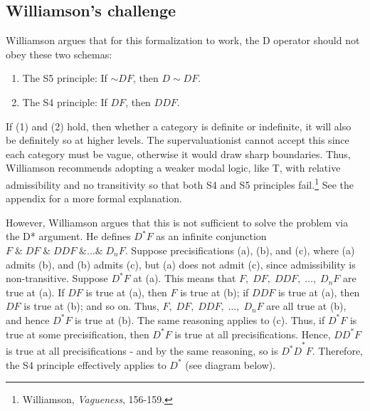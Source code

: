 \subsection{Williamson's challenge}

Williamson argues that for this formalization to work, the D operator
should not obey these two schemas:
\begin{enumerate}
\def\labelenumi{(\arabic{enumi})}
\item{The S5 principle: If ${\sim}DF$, then $D{\sim}DF$.}
\item{The S4 principle: If $DF$, then $DDF$.}
\end{enumerate}

If (1) and (2) hold, then whether a category is definite or indefinite,
it will also be definitely so at higher levels. The supervaluationist
cannot accept this since each category must be vague, otherwise it would
draw sharp boundaries. Thus, Williamson recommends adopting a weaker
modal logic, like T, with relative admissibility and no transitivity so
that both S4 and S5 principles fail.\footnote{Williamson,
  \emph{Vagueness}, 156-159.} See the appendix for a more formal
explanation.

However, Williamson argues that this is not sufficient to solve the
problem via the D* argument. He defines \(D^{*}F\) as an infinite
conjunction $F \; \&  \; DF \; \& \; DDF \; \& \ldots \& \; D_{n}F$. Suppose
precisifications (a), (b), and (c), where (a) admits (b), and (b) admits
(c), but (a) does not admit (c), since admissibility is non-transitive.
Suppose \(D^{*}F\) at (a). This means that
$F, \; DF, \; DDF, \; \ldots, \; D_{n}F$ are true at (a). If $DF$ is true at
(a), then $F$ is true at (b); if $DDF$ is true at (a), then $DF$
is true at (b); and so on. Thus, $F, \; DF, \; DDF, \; \ldots, \; D_{n}F$ are
all true at (b), and hence $D^{*}F$ is true at (b). The same reasoning
applies to (c). Thus, if $D^{*}F$ is true at some precisification,
then $D^{*}F$ is true at all precisifications. Hence, ${DD}^{*}F$ is
true at all precisifications - and by the same reasoning, so is
${D^{*}D}^{*}F$. Therefore, the S4 principle effectively applies to
$D^{*}$ (see diagram below).

\begin{center}
  \end{center}
  
